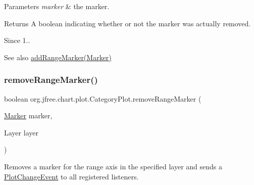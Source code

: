 \begin{DoxyParams}{Parameters}
{\em marker} & the marker.\\
\hline
\end{DoxyParams}
\begin{DoxyReturn}{Returns}
A boolean indicating whether or not the marker was actually removed.
\end{DoxyReturn}
\begin{DoxySince}{Since}
1..
\end{DoxySince}
\begin{DoxySeeAlso}{See also}
\mbox{\hyperlink{classorg_1_1jfree_1_1chart_1_1plot_1_1_category_plot_ab061ff38b94f1ee346e7d49a3c0140b6}{add\+Range\+Marker(\+Marker)}} 
\end{DoxySeeAlso}
\mbox{\label{classorg_1_1jfree_1_1chart_1_1plot_1_1_category_plot_adb5a2b51c5ccf0145d3170da5c686ff5}} 
\subsubsection{\texorpdfstring{remove\+Range\+Marker()}{removeRangeMarker()}\hspace{0.1cm}{\footnotesize\ttfamily [2/4]}}
{\footnotesize\ttfamily boolean org.\+jfree.\+chart.\+plot.\+Category\+Plot.\+remove\+Range\+Marker (\begin{DoxyParamCaption}\item[{\mbox{\hyperlink{classorg_1_1jfree_1_1chart_1_1plot_1_1_marker}{Marker}}}]{marker,  }\item[{Layer}]{layer }\end{DoxyParamCaption})}

Removes a marker for the range axis in the specified layer and sends a \mbox{\hyperlink{}{Plot\+Change\+Event}} to all registered listeners.


